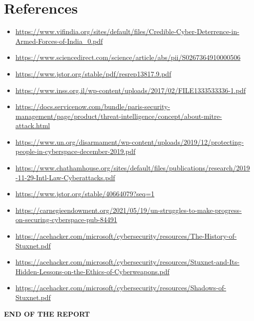 \documentclass{article}
\begin{document}
\section{References}
\begin{itemize}
\item \href{https://www.vifindia.org/sites/default/files/Credible-Cyber-Deterrence-in-Armed-Forces-of-India_0.pdf}{https://www.vifindia.org/sites/default/files/Credible-Cyber-Deterrence-in-Armed-Forces-of-India_0.pdf}
\item\href{
https://www.sciencedirect.com/science/article/abs/pii/S0267364910000506
}{
https://www.sciencedirect.com/science/article/abs/pii/S0267364910000506
}
\item\href{https://www.jstor.org/stable/pdf/resrep13817.9.pdf}{https://www.jstor.org/stable/pdf/resrep13817.9.pdf}
\item\href{https://www.inss.org.il/wp-content/uploads/2017/02/FILE1333533336-1.pdf}{https://www.inss.org.il/wp-content/uploads/2017/02/FILE1333533336-1.pdf}
\item\href{https://docs.servicenow.com/bundle/paris-security-management/page/product/threat-intelligence/concept/about-mitre-attack.html}{https://docs.servicenow.com/bundle/paris-security-management/page/product/threat-intelligence/concept/about-mitre-attack.html}
\item\href{https://www.un.org/disarmament/wp-content/uploads/2019/12/protecting-people-in-cyberspace-december-2019.pdf}{https://www.un.org/disarmament/wp-content/uploads/2019/12/protecting-people-in-cyberspace-december-2019.pdf}
\item\href{https://www.chathamhouse.org/sites/default/files/publications/research/2019-11-29-Intl-Law-Cyberattacks.pdf}{https://www.chathamhouse.org/sites/default/files/publications/research/2019-11-29-Intl-Law-Cyberattacks.pdf}
\item\href{https://www.jstor.org/stable/40664079?seq=1}{https://www.jstor.org/stable/40664079?seq=1}
\item\href{https://carnegieendowment.org/2021/05/19/un-struggles-to-make-progress-on-securing-cyberspace-pub-84491}{https://carnegieendowment.org/2021/05/19/un-struggles-to-make-progress-on-securing-cyberspace-pub-84491}
\item\href{https://acehacker.com/microsoft/cybersecurity/resources/The-History-of-Stuxnet.pdf}{https://acehacker.com/microsoft/cybersecurity/resources/The-History-of-Stuxnet.pdf}
\item\href{https://acehacker.com/microsoft/cybersecurity/resources/Stuxnet-and-Its-Hidden-Lessons-on-the-Ethics-of-Cyberweapons.pdf}{https://acehacker.com/microsoft/cybersecurity/resources/Stuxnet-and-Its-Hidden-Lessons-on-the-Ethics-of-Cyberweapons.pdf}
\item\href{https://acehacker.com/microsoft/cybersecurity/resources/Shadows-of-Stuxnet.pdf}{https://acehacker.com/microsoft/cybersecurity/resources/Shadows-of-Stuxnet.pdf}
\end{itemize}
\centering \textbf{END OF THE REPORT}
\end{document}
